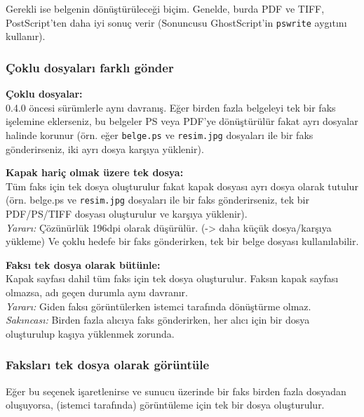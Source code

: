 \documentclass[a4paper,10pt]{scrartcl}
\begin{document}
Gerekli ise belgenin dönüştürüleceği biçim. Genelde, burda PDF ve TIFF, PostScript'ten daha iyi sonuç verir (Sonuncusu GhostScript'in \texttt{pswrite} aygıtını kullanır).

\subsubsection{Çoklu dosyaları farklı gönder}

{\parindent0pt
\textbf{Çoklu dosyalar:}\\
0.4.0 öncesi sürümlerle aynı davranış. Eğer birden fazla belgeleyi tek bir faks işelemine eklerseniz, bu belgeler PS veya PDF'ye dönüştürülür fakat ayrı dosyalar halinde korunur (örn. eğer \texttt{belge.ps} ve \texttt{resim.jpg} dosyaları ile bir faks gönderirseniz, iki ayrı dosya karşıya yüklenir).
\medskip

\textbf{Kapak hariç olmak üzere tek dosya:}\\
Tüm faks için tek dosya oluşturulur fakat kapak dosyası ayrı dosya olarak tutulur (örn. {belge.ps} ve \texttt{resim.jpg} dosyaları ile bir faks gönderirseniz, tek bir PDF/PS/TIFF dosyası oluşturulur ve karşıya yüklenir).\\
\textit{Yararı:} Çözünürlük 196dpi olarak düşürülür. (-> daha küçük dosya/karşıya yükleme) Ve çoklu hedefe bir faks gönderirken, tek bir belge dosyası kullanılabilir.
\medskip

\textbf{Faksı tek dosya olarak bütünle:}\\
Kapak sayfası dahil tüm faks için tek dosya oluşturulur. Faksın kapak sayfası olmazsa, adı geçen durumla aynı davranır.\\
\textit{Yararı:} Giden faksı görüntülerken istemci tarafında dönüştürme olmaz.\\
\textit{Sakıncası:} Birden fazla alıcıya faks gönderirken, her alıcı için bir dosya oluşturulup kaşıya yüklenmek zorunda.
}

\subsubsection{Faksları tek dosya olarak görüntüle}
Eğer bu seçenek işaretlenirse ve sunucu üzerinde bir faks birden fazla dosyadan oluşuyorsa, (istemci tarafında) görüntüleme için tek bir dosya oluşturulur.
\end{document}
